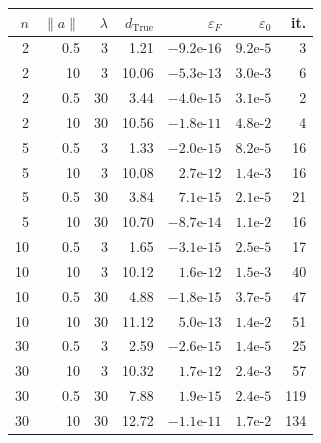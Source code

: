 \begin{tabular}{rrrrrrr}
\toprule
$n$ & $\|a\|$ & $\lambda$ & $d_{\mathrm{True}}$ & $\varepsilon_F$ & $\varepsilon_0$ & it. \\
\midrule
2 & 0.5 & 3 & 1.21 & $-9.2\text{e-}16$ & $9.2\text{e-}5$ & 3 \\
2 & 10 & 3 & 10.06 & $-5.3\text{e-}13$ & $3.0\text{e-}3$ & 6 \\
2 & 0.5 & 30 & 3.44 & $-4.0\text{e-}15$ & $3.1\text{e-}5$ & 2 \\
2 & 10 & 30 & 10.56 & $-1.8\text{e-}11$ & $4.8\text{e-}2$ & 4 \\
\midrule
5 & 0.5 & 3 & 1.33 & $-2.0\text{e-}15$ & $8.2\text{e-}5$ & 16 \\
5 & 10 & 3 & 10.08 & $2.7\text{e-}12$ & $1.4\text{e-}3$ & 16 \\
5 & 0.5 & 30 & 3.84 & $7.1\text{e-}15$ & $2.1\text{e-}5$ & 21 \\
5 & 10 & 30 & 10.70 & $-8.7\text{e-}14$ & $1.1\text{e-}2$ & 16 \\
\midrule
10 & 0.5 & 3 & 1.65 & $-3.1\text{e-}15$ & $2.5\text{e-}5$ & 17 \\
10 & 10 & 3 & 10.12 & $1.6\text{e-}12$ & $1.5\text{e-}3$ & 40 \\
10 & 0.5 & 30 & 4.88 & $-1.8\text{e-}15$ & $3.7\text{e-}5$ & 47 \\
10 & 10 & 30 & 11.12 & $5.0\text{e-}13$ & $1.4\text{e-}2$ & 51 \\
\midrule
30 & 0.5 & 3 & 2.59 & $-2.6\text{e-}15$ & $1.4\text{e-}5$ & 25 \\
30 & 10 & 3 & 10.32 & $1.7\text{e-}12$ & $2.4\text{e-}3$ & 57 \\
30 & 0.5 & 30 & 7.88 & $1.9\text{e-}15$ & $2.4\text{e-}5$ & 119 \\
30 & 10 & 30 & 12.72 & $-1.1\text{e-}11$ & $1.7\text{e-}2$ & 134 \\
\bottomrule
\end{tabular}
